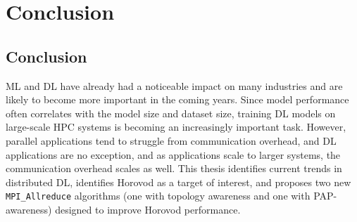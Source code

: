 
\chapter[Conclusion]{Conclusion}\label{ch:CH6-Conclusion}

\section{Conclusion}

\gls{ML} and \gls{DL} have already had a noticeable impact on many industries and are likely to become more important in the coming years.
Since model performance often correlates with the model size and dataset size, training \gls{DL} models on large-scale \gls{HPC} systems is becoming an increasingly important task.
However, parallel applications tend to struggle from communication overhead, and \gls{DL} applications are no exception, and as applications scale to larger systems, the communication overhead scales as well.  
This thesis identifies current trends in distributed \gls{DL}, identifies Horovod as a target of interest, and proposes two new \texttt{MPI\_Allreduce} algorithms (one with topology awareness and one with \gls{PAP}-awareness) designed to improve Horovod performance.

